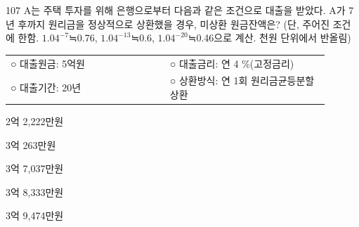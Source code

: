 \begin{question}{107}
A는 주택 투자를 위해 은행으로부터 다음과 같은 조건으로 대출을 받았다. A가 7년 후까지 원리금을 정상적으로 상환했을 경우, 미상환 원금잔액은? (단, 주어진 조건에 한함. $1.04^{-7}$≒0.76, $1.04^{-13}$≒0.6, $1.04^{-20}$≒0.46으로 계산. 천원 단위에서 반올림)
\begin{framedtext}
\begin{tabular}{@{}p{0.45\linewidth}p{0.45\linewidth}@{}}
○ 대출원금: 5억원 & ○ 대출금리: 연 4 \%(고정금리) \\
○ 대출기간: 20년 & ○ 상환방식: 연 1회 원리금균등분할상환
\end{tabular}
\end{framedtext}
\begin{choices}
  \item 2억 2,222만원
  \item 3억 263만원
  \item 3억 7,037만원
  \item 3억 8,333만원
  \item 3억 9,474만원
\end{choices}
\end{question}
